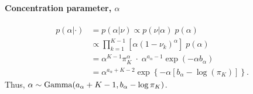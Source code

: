 \paragraph{Concentration parameter, $\alpha$}
\begin{align*}
p(\alpha|\cdot) & = p(\alpha|\nu) \propto p(\nu|\alpha)\;p(\alpha)\\
& \propto \prod_{k=1}^{K-1} \left[\alpha (1-\nu_k)^\alpha \right]\;p(\alpha)\\
& = \alpha^{K-1} \pi_K^\alpha\; \cdot \; \alpha^{a_\alpha - 1} \exp(-\alpha b_\alpha)\\
& = \alpha^{a_\alpha + K - 2} \exp\left\{-\alpha \left[ b_\alpha - \log(\pi_K)\right]\right\}. 
\end{align*}
Thus, $\alpha \sim \operatorname{Gamma}(a_\alpha + K - 1, b_\alpha - \log \pi_K)$.